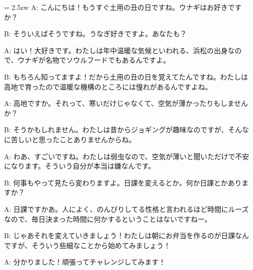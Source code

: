 \documentclass[11pt]{amsart}
\title{}
\author{}
\newenvironment{hangall}[1]{\hangindent = 2.5zw\everypar{\hangindent = 2.5zw}}{}
\begin{document}
\maketitle
\begin{hangall}{}%
A: こんにちは！もうすぐ土用の丑の日ですね。ウナギはお好きですか？



B: そういえばそうですね。うなぎ好きですよ。あなたも？



A: はい！大好きです。わたしは年中温暖な気候といわれる、浜松の出身なので、ウナギが名物でソウルフードでもあるんですよ。



B: もちろん知ってますよ！だから土用の丑の日を覚えてたんですね。わたしは高地で育ったので温暖な機構のところには憧れがあるんですよね。



A: 高地ですか。それって、寒いだけじゃなくて、空気が薄かったりもしませんか？



B: そうかもしれません。わたしは昔からジョギングが趣味なのですが、そんなに苦しいと思ったことありませんからね。



A: わあ、すごいですね。わたしは弱虫なので、空気が薄いと聞いただけで不安になります。そういう自分が本当は嫌なんです。



B: 何事もやって見たら変わりますよ。日課を変えるとか。何か日課とかありますか？



A: 日課ですかあ。人によく、のんびりしてる性格と言われるほど時間にルーズなので、毎日決まった時間に何かするということはないですねー。



B: じゃあそれを変えていきましょう！わたしは朝にお弁当を作るのが日課なんですが、そういう些細なことから始めてみましょう！



A: 分かりました！頑張ってチャレンジしてみます！\end{hangall}
\end{document}
